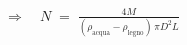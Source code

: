 \documentclass[preview]{standalone}
\begin{document}
\begin{align*}
\Rightarrow\quad N \;=\; \frac{4M}{(\rho_{\text{acqua}}-\rho_{\text{legno}})\,\pi D^2 L}
\end{align*}
\end{document}
